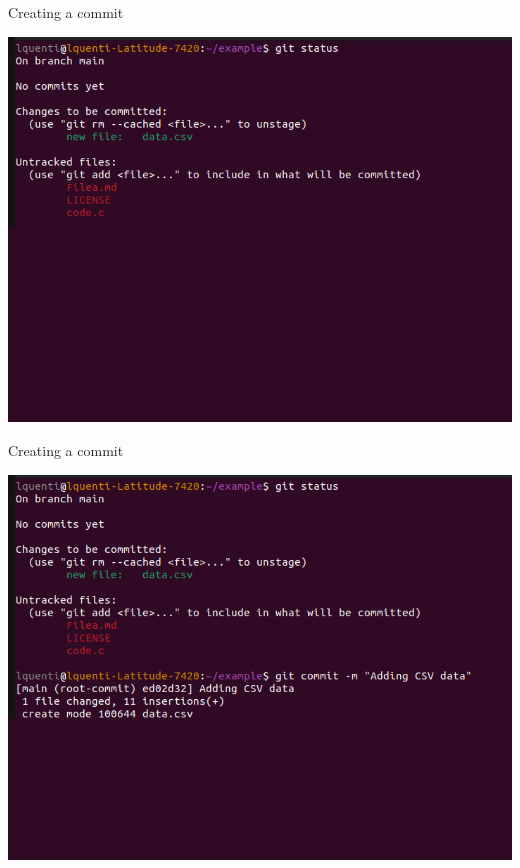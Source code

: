 \documentclass[compress,aspectratio=169]{beamer}
\begin{document}
  \begin{frame}{Creating a commit}
    \begin{center}
      \includegraphics[height=0.85\textheight]{./assets/terminal_slideshows/02_commits_01.png}
    \end{center}
  \end{frame}
  \begin{frame}[noframenumbering]{Creating a commit}
    \begin{center}
      \includegraphics[height=0.85\textheight]{./assets/terminal_slideshows/02_commits_02.png}
    \end{center}
  \end{frame}
\end{document}
